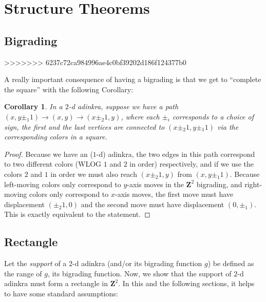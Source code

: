 \documentclass[12pt,twoside,singlespace]{article}
\numberwithin{equation}{section}
\newtheorem{cor}[equation]{Corollary}
\theoremstyle{definition}
\newcommand{\ZZ}{\mathbf{Z}}
\begin{document}
\section{Structure Theorems}

\subsection{Bigrading}

>>>>>>> 6237c72ca984996ae4c0bf39202d186f124377b0

A really important consequence of having a bigrading is that we get to ``complete the square'' with the following Corollary:

\begin{cor}
\label{cor:square}
In a $2$-d adinkra, suppose we have a path $(x, y \pm_1 1) \rightarrow (x, y) \rightarrow (x \pm_2 1, y)$, where each $\pm_i$ corresponds to a choice of sign, the first and the last vertices are connected to $(x \pm_2 1, y \pm_1 1)$ via the corresponding colors in a square.
\end{cor}
\begin{proof}
Because we have an ($1$-d) adinkra, the two edges in this path correspond to two different colors (WLOG $1$ and $2$ in order) respectively, and if we use the colors $2$ and $1$ in order we must also reach $(x \pm_2 1, y)$ from $(x, y \pm_1 1)$. Because left-moving colors only correspond to $y$-axis moves in the $\ZZ^2$ bigrading, and right-moving colors only correspond to $x$-axis moves, the first move must have displacement $(\pm_2 1, 0)$ and the second move must have displacement $(0, \pm_1)$. This is exactly equivalent to the statement.
\end{proof}

\subsection{Rectangle}

Let the \emph{support} of a $2$-d adinkra (and/or its bigrading function $g$) be defined as the range of $g$, its bigrading function. Now, we show that the support of $2$-d adinkra must form a rectangle in $\ZZ^2$. In this and the following sections, it helps to have some standard assumptions:
\end{document}

